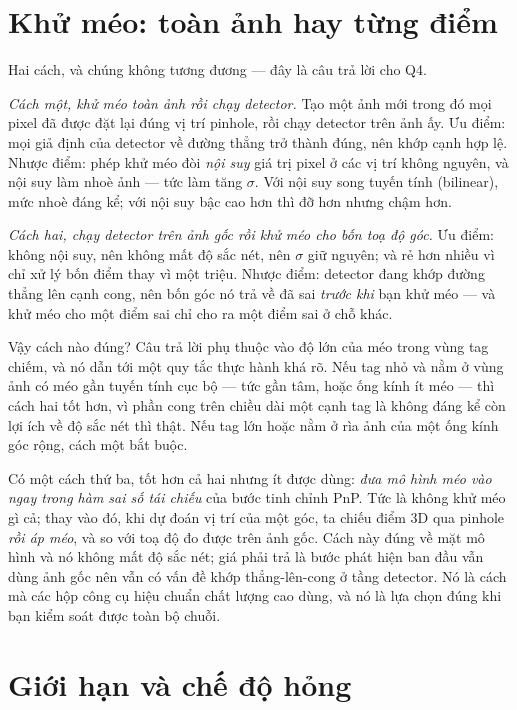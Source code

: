 \documentclass[../../marker.tex]{subfiles}
\begin{document}
\section{Khử méo: toàn ảnh hay từng điểm}

Hai cách, và chúng không tương đương --- đây là câu trả lời cho Q4.

\emph{Cách một, khử méo toàn ảnh rồi chạy detector.} Tạo một ảnh mới trong đó mọi pixel đã được đặt lại đúng vị trí pinhole, rồi chạy detector trên ảnh ấy. Ưu điểm: mọi giả định của detector về đường thẳng trở thành đúng, nên khớp cạnh hợp lệ. Nhược điểm: phép khử méo đòi \emph{nội suy} giá trị pixel ở các vị trí không nguyên, và nội suy làm nhoè ảnh --- tức làm tăng \(\sigma\). Với nội suy song tuyến tính (bilinear), mức nhoè đáng kể; với nội suy bậc cao hơn thì đỡ hơn nhưng chậm hơn.

\emph{Cách hai, chạy detector trên ảnh gốc rồi khử méo cho bốn toạ độ góc.} Ưu điểm: không nội suy, nên không mất độ sắc nét, nên \(\sigma\) giữ nguyên; và rẻ hơn nhiều vì chỉ xử lý bốn điểm thay vì một triệu. Nhược điểm: detector đang khớp đường thẳng lên cạnh cong, nên bốn góc nó trả về đã sai \emph{trước khi} bạn khử méo --- và khử méo cho một điểm sai chỉ cho ra một điểm sai ở chỗ khác.

Vậy cách nào đúng? Câu trả lời phụ thuộc vào độ lớn của méo trong vùng tag chiếm, và nó dẫn tới một quy tắc thực hành khá rõ. Nếu tag nhỏ và nằm ở vùng ảnh có méo gần tuyến tính cục bộ --- tức gần tâm, hoặc ống kính ít méo --- thì cách hai tốt hơn, vì phần cong trên chiều dài một cạnh tag là không đáng kể còn lợi ích về độ sắc nét thì thật. Nếu tag lớn hoặc nằm ở rìa ảnh của một ống kính góc rộng, cách một bắt buộc.

Có một cách thứ ba, tốt hơn cả hai nhưng ít được dùng: \emph{đưa mô hình méo vào ngay trong hàm sai số tái chiếu} của bước tinh chỉnh PnP. Tức là không khử méo gì cả; thay vào đó, khi dự đoán vị trí của một góc, ta chiếu điểm 3D qua pinhole \emph{rồi áp méo}, và so với toạ độ đo được trên ảnh gốc. Cách này đúng về mặt mô hình và nó không mất độ sắc nét; giá phải trả là bước phát hiện ban đầu vẫn dùng ảnh gốc nên vẫn có vấn đề khớp thẳng-lên-cong ở tầng detector. Nó là cách mà các hộp công cụ hiệu chuẩn chất lượng cao dùng, và nó là lựa chọn đúng khi bạn kiểm soát được toàn bộ chuỗi.

\section{Giới hạn và chế độ hỏng}
\end{document}
